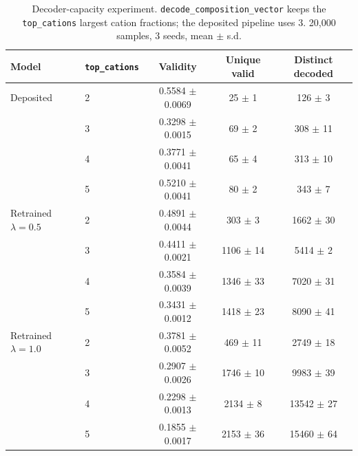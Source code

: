 \begin{table}[t]
\centering
\caption{Decoder-capacity experiment. \texttt{decode\_composition\_vector} keeps the \texttt{top\_cations} largest cation fractions; the deposited pipeline uses 3. 20{,}000 samples, 3 seeds, mean $\pm$ s.d.}
\label{tab:a8_top_cations}
\begin{tabular}{llccc}
\toprule
Model & \texttt{top\_cations} & Validity & Unique valid & Distinct decoded \\
\midrule
Deposited & 2 & 0.5584 $\pm$ 0.0069 & 25 $\pm$ 1 & 126 $\pm$ 3 \\
 & 3 & 0.3298 $\pm$ 0.0015 & 69 $\pm$ 2 & 308 $\pm$ 11 \\
 & 4 & 0.3771 $\pm$ 0.0041 & 65 $\pm$ 4 & 313 $\pm$ 10 \\
 & 5 & 0.5210 $\pm$ 0.0041 & 80 $\pm$ 2 & 343 $\pm$ 7 \\
\midrule
Retrained $\lambda=0.5$ & 2 & 0.4891 $\pm$ 0.0044 & 303 $\pm$ 3 & 1662 $\pm$ 30 \\
 & 3 & 0.4411 $\pm$ 0.0021 & 1106 $\pm$ 14 & 5414 $\pm$ 2 \\
 & 4 & 0.3584 $\pm$ 0.0039 & 1346 $\pm$ 33 & 7020 $\pm$ 31 \\
 & 5 & 0.3431 $\pm$ 0.0012 & 1418 $\pm$ 23 & 8090 $\pm$ 41 \\
\midrule
Retrained $\lambda=1.0$ & 2 & 0.3781 $\pm$ 0.0052 & 469 $\pm$ 11 & 2749 $\pm$ 18 \\
 & 3 & 0.2907 $\pm$ 0.0026 & 1746 $\pm$ 10 & 9983 $\pm$ 39 \\
 & 4 & 0.2298 $\pm$ 0.0013 & 2134 $\pm$ 8 & 13542 $\pm$ 27 \\
 & 5 & 0.1855 $\pm$ 0.0017 & 2153 $\pm$ 36 & 15460 $\pm$ 64 \\
\bottomrule
\end{tabular}
\end{table}
